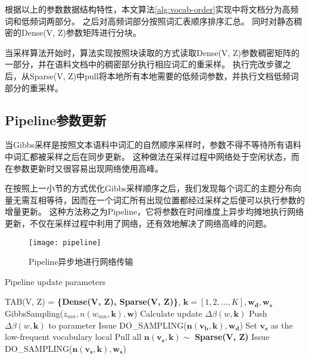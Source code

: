 根据以上的参数数据结构特性，本文算法\ref{alg:vocab-order}实现中将文档分为高频词和低频词两部分。
之后对高频词部分按照词汇表顺序排序汇总。
同时对静态稠密的Dense(V, Z)参数矩阵进行分块。

当采样算法开始时，算法实现按照块读取的方式读取Dense(V, Z)参数稠密矩阵的一部分，并在语料文档中的稠密部分执行相应词汇的重采样。
执行完改步骤之后，从Sparse(V, Z)中pull将本地所有本地需要的低频词参数，并执行文档低频词部分的重采样。

\subsection{Pipeline参数更新}
当Gibbs采样是按照文本语料中词汇的自然顺序采样时，参数不得不等待所有语料中词汇都被采样之后在同步更新。
这种做法在采样过程中网络处于空闲状态，而在参数更新时又很容易出现网络使用高峰。

在按照上一小节的方式优化Gibbs采样顺序之后，我们发现每个词汇的主题分布向量无需互相等待，因而在一个词汇所有出现位置都经过采样之后便可以执行参数的增量更新。
这种方法称之为Pipeline，它将参数在时间维度上异步均摊地执行网络更新，不仅在采样过程中利用了网络，还有效地解决了网络高峰的问题。

\begin{figure}[htb]\centering
\texttt{[image: pipeline]}
\caption{Pipeline异步地进行网络传输}
\label{fig:pipeline}       %
\end{figure}


\begin{algorithm}[htb]
\caption{Pipeline update parameters} 
\label{alg:vocab-order}
\begin{algorithmic}[1]
\Require TAB(V, Z) = \textbf{\{Dense(V, Z), Sparse(V, Z)\}}, $\mathbf{k} = [1, 2, ..., K], \mathbf{w_d, w_s}$
\State GibbsSampling($z_{mn}, n(w_{mn}, \mathbf{k}), \mathbf{w}$)
\EndFor
\State Calculate update $\Delta \beta(w, \mathbf{k})$
\State Push $\Delta \beta(w, \mathbf{k})$ to parameter
\EndFor
\EndFunction
{}
\State Issue DO\_SAMPLING($\mathbf{n(v_b, k), w_d}$)
\EndFor
\State Set $\mathbf{v_s}$ as the low-frequent vocabulary local
\State Pull all $\mathbf{n(v_s, k)} \sim $ \textbf{Sparse(V, Z)}
\State Issue DO\_SAMPLING($\mathbf{n(v_s, k), w_s}$)
\end{algorithmic}  
\end{algorithm}  

